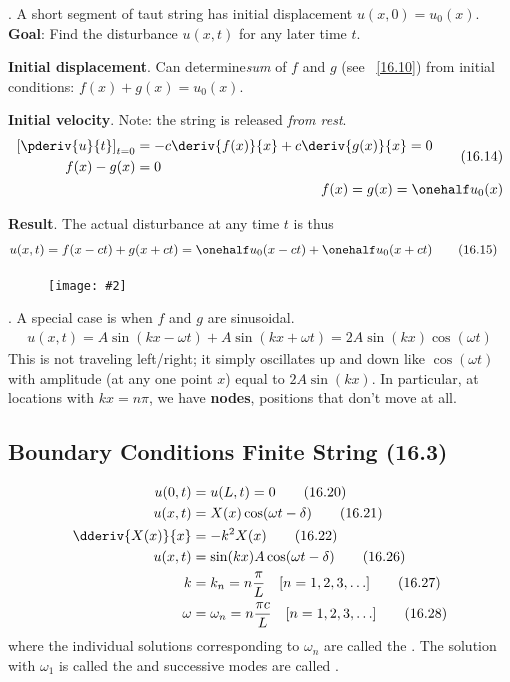 \documentclass[10pt, twocolumn]{article}
\newcommand\myfig[2][0.3\textwidth]{\begin{figure}[h!]\centering\texttt{[image: \#2]}\end{figure}}
\newcommand{\myspace}{\vspace{3\bigskipamount}}
\newcommand\p{\Needspace{10\baselineskip} \noindent}
\newcommand\tlab[1]{\tag{#1}\label{#1}}
\begin{document}
\myspace 
{}
\p {}. A short segment of taut string has initial displacement $u(x, 0) = u_0(x)$. \textbf{Goal}: Find the disturbance $u(x, t)$ for any later time $t$. 
\begin{compactitem}
	\item \textbf{Initial displacement}. Can determine\textit{sum} of $f$ and $g$ (see ~\ref{16.10}) from initial conditions: $f(x) + g(x) = u_0(x)$. 
	\item \textbf{Initial velocity}. Note: the string is released \textit{from rest}.
	\begin{align}
	\begin{split}
		\left[ \pderiv{u}{t}\right]_{t = 0} &= -c \deriv{f(x)}{x} + c \deriv{g(x)}{x} = 0  \\
		f(x) - g(x) &= 0
	\end{split} \tlab{16.14}\\
	f(x) = g(x) = \onehalf u_0(x)
	\end{align}
	\item \textbf{Result}. The actual disturbance at any time $t$ is thus
	\begin{align}
		u(x, t) &= f(x - ct) + g(x + ct) = \onehalf u_0(x - ct) + \onehalf u_0(x + ct)\tlab{16.15}
	\end{align}
	\myfig[0.25\textwidth]{TriangleWave.PNG}
\end{compactitem}

\myspace
\p {}. A special case is when $f$ and $g$ are sinusoidal. 
\begin{align}
u(x, t) = A\sin(kx - \omega t) + A\sin(kx + \omega t) = 2A\sin(kx)\cos(\omega t)\tlab{16.18}
\end{align}
This is not traveling left/right; it simply oscillates up and down like $\cos(\omega t)$ with amplitude (at any one point $x$) equal to $2A\sin(kx)$. In particular, at locations with $kx = n\pi$, we have \textbf{nodes}, positions that don't move at all. 

\myspace 
\subsection{Boundary Conditions Finite String (16.3)}

\begin{align}
u(0, t) &= u(L, t) = 0 \tlab{16.20} \\
u(x, t) &= X(x)\cos(\omega t - \delta) \tlab{16.21} \\
\dderiv{X(x)}{x} &= -k^2 X(x) \tlab{16.22} \\
u(x, t) &= \sin(kx)A\cos(\omega t - \delta) \tlab{16.26} \\
k &= k_n  = n\frac{\pi}{L} \quad [n = 1,2,3,\ldots]\tlab{16.27} \\
\omega &= \omega_n  = n\frac{\pi c}{L} \quad [n = 1,2,3,\ldots]\tlab{16.28}
\end{align}
where the individual solutions corresponding to $\omega_n$ are called the . The solution with $\omega_1$ is called the  and successive modes are called . \\
\end{document}
